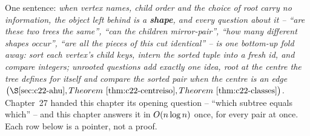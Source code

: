 

One sentence: \emph{when vertex names, child order and the choice of root carry no
information, the object left behind is a \textbf{shape}, and every question about it --
``are these two trees the same'', ``can the children mirror-pair'', ``how many different
shapes occur'', ``are all the pieces of this cut identical'' -- is one bottom-up fold away:
sort each vertex's child keys, intern the sorted tuple into a fresh id, and compare
integers; unrooted questions add exactly one idea, root at the centre the tree defines for
itself and compare the sorted pair when the centre is an edge
\(\bigl(\secref{c22-ahu}, \thmref{c22-centreiso}, \thmref{c22-classes}\bigr)\).}
Chapter~27 handed this chapter its opening question -- ``which subtree equals which'' --
and this chapter answers it in \(O(n\log n)\) once, for every pair at once.  Each row
below is a pointer, not a proof.

